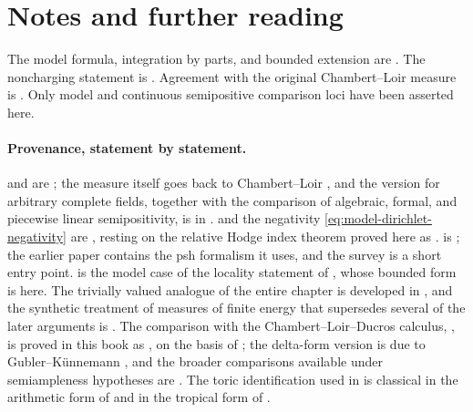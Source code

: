 \section*{Notes and further reading}

The model formula, integration by parts, and bounded extension are
\cite[Proposition--Definition~2.18, Propositions~2.19--2.21, and
Theorem~3.1]{BFJ15}. The noncharging statement is
\cite[Proposition~3.7]{BFJ15}. Agreement with the original Chambert--Loir
measure is \cite[\S3.2]{BFJ15}. Only model and continuous semipositive
comparison loci have been asserted here.

\paragraph{Provenance, statement by statement.}
 and  are
\cite[\S2.7]{BFJ15}; the measure itself goes back to Chambert--Loir
\cite{CL06}, and the version for arbitrary complete fields, together with
the comparison of algebraic, formal, and piecewise linear semipositivity, is
in \cite{GM19}.   and the negativity
\eqref{eq:model-dirichlet-negativity} are \cite[\S2]{BFJ15}, resting on the
relative Hodge index theorem proved here as .
 is \cite[Theorem~3.1]{BFJ15}; the earlier
paper \cite{BFJ16} contains the psh formalism it uses, and the survey
\cite{BFJ16b} is a short entry point.  
is the model case of the locality statement of \cite[\S3]{BFJ15}, whose
bounded form is
 here.  The trivially valued analogue of
the entire chapter is developed in \cite{BJ22}, and the synthetic treatment of
measures of finite energy that supersedes several of the later arguments is
\cite{BJ25FiniteEnergy}.  The comparison with the Chambert--Loir--Ducros
calculus, , is proved in this book as
, on the basis of
\cite[Theorem~18.5.5 and Proposition~18.5.8]{CLD25}; the delta-form version
is due to Gubler--K\"unnemann \cite{GK17,GK19}, and the broader comparisons
available under semiampleness hypotheses are
\cite[Theorems~7.14 and~8.4]{BE21}.  The toric identification used in
 is classical in the arithmetic form of
\cite{BGPS14} and in the tropical form of \cite{BGJKK25}.

